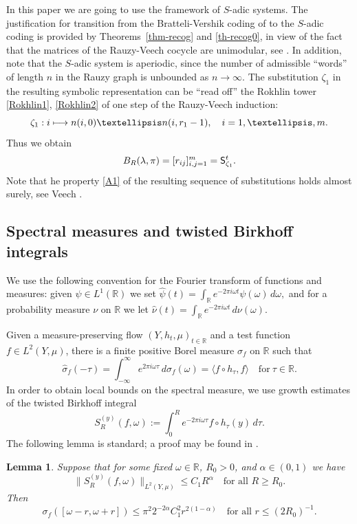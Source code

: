\documentclass[11pt]{article}
\numberwithin{equation}{section}\newcommand{\Relation}[2][]{}\newtheorem*{prop*}{Proposition}
\def\mto{\mathchoice{\longmapsto}{\mapsto}{\mapsto}{\mapsto}}
\newcommand{\sep}{:}
\theoremstyle{plain}
\newtheorem{lemma}[theorem]{Lemma}
\theoremstyle{definition}
\let\lam\lambda
\let\om\omega
\let\sig\sigma
\newcommand{\R}{\mathbb{R}}
\newcommand\Sf{{\sf S}}
\newcommand\be{\begin{equation}}
\newcommand\ee{\end{equation}}
\begin{document}
In this paper we are going to use the framework of $S$-adic systems. The justification for transition from the Bratteli-Vershik coding of \cite{Buf-umn} to the $S$-adic coding is provided by Theorems~\ref{thm-recog} and \ref{th-recog0}, in view of the fact that the matrices of the Rauzy-Veech cocycle are unimodular, see \cite{veech,veechamj}. In addition, note that the $S$-adic system is aperiodic, since the number of admissible ``words'' of length $n$ in the Rauzy graph is unbounded as $n\to \infty$.
The substitution $\zeta_1$ in the resulting symbolic representation can be ``read off'' the Rokhlin tower \eqref{Rokhlin1}, \eqref{Rokhlin2} of one step of the Rauzy-Veech induction:
\be \label{induc}
\zeta_1\sep i \mto n(i,0)\ldots n(i, r_1-1),\quad i=1,\ldots,m.
\ee
Thus we obtain
\[
B_R(\lam,\pi) = { [r_{ij}]_{i,j=1}^m} = \Sf_{\zeta_1}^t.\]
Note that he property \eqref{A1} of the resulting sequence of substitutions
holds almost surely, see Veech \cite{veech}.


\subsection{Spectral measures and twisted Birkhoff integrals} \label{sec-twist}
We use the following convention for the Fourier transform of functions and measures: given $\psi\in L^1(\R)$ we set
$
\widehat{\psi}(t) = \int_\R e^{-2\pi i \om t} \psi(\om)\,d\om,
$
and for a probability measure $\nu$ on $\R$ we let
$
\widehat{\nu}(t) = \int_\R e^{-2\pi i \om t}\,d\nu(\om).
$

Given a measure-preserving flow
$(Y, h_t,\mu)_{t\in \R}$ and a test function $f\in L^2(Y,\mu)$,
there is a finite positive Borel measure $\sig_f$ on $\R$ such that
\[
\widehat{\sig}_f(-\tau)=\int_{-\infty}^\infty e^{2 \pi i\om \tau}\,d\sig_f(\om) = \langle f\circ h_\tau, f\rangle\quad \text{for}\ \tau\in \R.
\]
In order to obtain local bounds on the spectral measure, we use growth estimates of the twisted Birkhoff integral
\be \label{twist1}
S_R^{(y)}(f,\om) := \int_0^R e^{-2\pi i \om \tau} f\circ h_\tau(y)\,d\tau.
\ee
The following lemma is standard; a proof may be found in \cite[Lem.\,4.3]{BuSol2}.

\begin{lemma} \label{lem-varr} Suppose that for some fixed $\om \in \R$, $R_0>0$, and $\alpha \in (0,1)$ we have
\be \label{L2est}
\bigl\|S_R^{(y)}(f,\om)\bigr\|_{L^2(Y,\mu)}\le C_1R^\alpha\quad \text{for all }R\ge R_0.
\ee
Then
\be \label{locest}
\sig_f([\om-r,\om+r]) \le \pi^2 2^{-2\alpha} C_1^2 r^{2(1-\alpha)}\quad \text{for all }r \le (2R_0)^{-1}.
\ee
\end{lemma}
\end{document}
